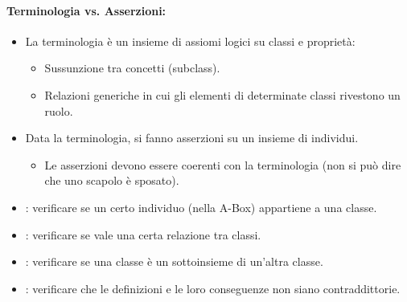 
\paragraph{Terminologia vs. Asserzioni:}

\begin{itemize}
  \item La terminologia è un insieme di assiomi logici su classi
e proprietà: 
\begin{itemize}
  \item Sussunzione tra concetti (subclass). 
  \item Relazioni generiche in cui gli elementi di determinate classi
rivestono un ruolo.
\end{itemize}
\item Data la terminologia, si fanno asserzioni su un insieme
di individui. 
\begin{itemize}
  \item Le asserzioni devono essere coerenti con la terminologia (non
si può dire che uno scapolo è sposato). 
\end{itemize}
\end{itemize}


\begin{itemize}
\item {}: verificare se un
certo individuo (nella A-Box)
appartiene a una classe. 
\item {}: verificare se vale
una certa relazione tra classi.
\item {}: verificare se una classe
è un sottoinsieme di un'altra classe.
\item {}: verificare che le
definizioni e le loro conseguenze non
siano contraddittorie.
\end{itemize}

